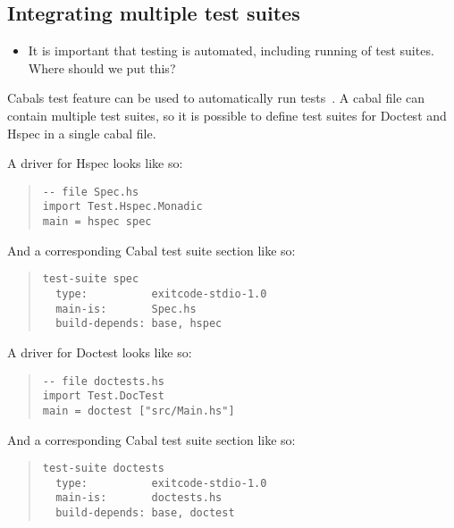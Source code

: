 \documentclass[preprint]{sigplanconf}
\begin{document}
\subsection{Integrating multiple test suites}

\begin{itemize}

\item It is important that testing is automated, including running of test
    suites.  Where should we put this?
\end{itemize}

\noindent Cabals test feature can be used to automatically run tests~\cite{cabal}.  A cabal
file can contain multiple test suites, so it is possible to define test suites
for Doctest and Hspec in a single cabal file.

A driver for Hspec looks like so:

\begin{quote}
\small
\begin{verbatim}
-- file Spec.hs
import Test.Hspec.Monadic
main = hspec spec
\end{verbatim}
\end{quote}

\noindent And a corresponding Cabal test suite section like so:

\begin{quote}
\small
\begin{verbatim}
test-suite spec
  type:          exitcode-stdio-1.0
  main-is:       Spec.hs
  build-depends: base, hspec
\end{verbatim}
\end{quote}

\noindent A driver for Doctest looks like so:

\begin{quote}
\small
\begin{verbatim}
-- file doctests.hs
import Test.DocTest
main = doctest ["src/Main.hs"]
\end{verbatim}
\end{quote}

\noindent And a corresponding Cabal test suite section like so:

\begin{quote}
\small
\begin{verbatim}
test-suite doctests
  type:          exitcode-stdio-1.0
  main-is:       doctests.hs
  build-depends: base, doctest
\end{verbatim}
\end{quote}
\end{document}
